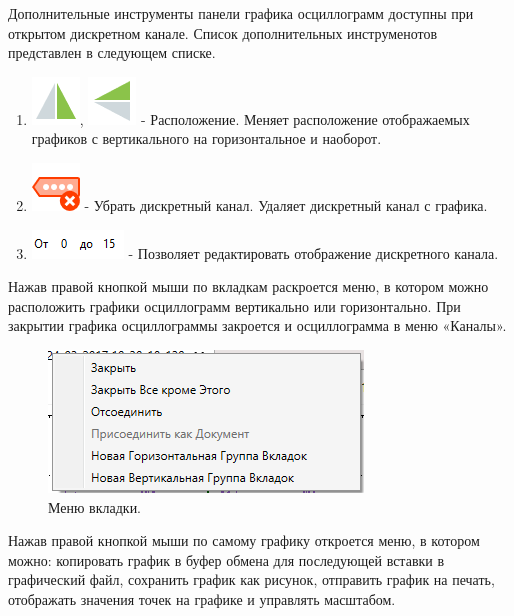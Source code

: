 \documentclass[a4paper,12pt]{article}
\begin{document}
Дополнительные инструменты панели графика осциллограмм доступны при открытом дискретном канале. Список дополнительных инструменотов представлен в следующем списке. 

\begin{enumerate}
\item \includegraphics[width=4ex]{image/FlipVertical.png}, \includegraphics[width=4ex]{image/FlipHorizontal.png}  - Расположение. Меняет расположение отображаемых графиков с вертикального на горизонтальное и наоборот.
\item \includegraphics[width=4ex]{image/Dig_Cancel.png} - Убрать дискретный канал. Удаляет дискретный канал с графика.
\item \includegraphics[width=12ex]{image/Screenshot_1.png} - Позволяет редактировать отображение дискретного канала.
\end {enumerate}

Нажав правой кнопкой мыши по вкладкам раскроется меню, в котором можно расположить графики осциллограмм вертикально или горизонтально. При закрытии графика осциллограммы закроется и осциллограмма в меню «Каналы».

\begin{figure}[h]
\centering
\includegraphics[width=40ex]{image/Screenshot_4.png}
\caption{Меню вкладки.}
\end{figure}

Нажав правой кнопкой мыши по самому графику откроется меню, в котором можно: копировать график в буфер обмена для последующей вставки в графический файл, сохранить график как рисунок, отправить график на печать, отображать значения точек на графике и управлять масштабом.
\end{document}
